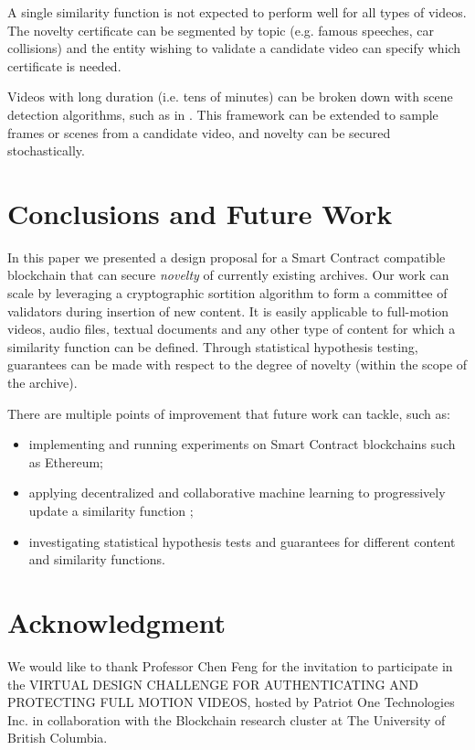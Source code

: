 \documentclass[conference]{IEEEtran}
\begin{document}
A single similarity function is not expected to perform well for all types of videos. The novelty certificate can be segmented by topic (e.g. famous speeches, car collisions) and the entity wishing to validate a candidate video can specify which certificate is needed. 

Videos with long duration (i.e. tens of minutes) can be broken down with scene detection algorithms, such as in \cite{bui2019archangel}. This framework can be extended to sample frames or scenes from a candidate video, and novelty can be secured stochastically.

\section{Conclusions and Future Work}
In this paper we presented a design proposal for a Smart Contract compatible blockchain that can secure \emph{novelty} of currently existing archives. Our work can scale by leveraging a cryptographic sortition algorithm to form a committee of validators during insertion of new content. It is easily applicable to full-motion videos, audio files, textual documents and any other type of content for which a similarity function can be defined. Through statistical hypothesis testing, guarantees can be made with respect to the degree of novelty (within the scope of the archive).

There are multiple points of improvement that future work can tackle, such as:
\begin{itemize}
    \item implementing and running experiments on Smart Contract blockchains such as Ethereum;
    \item applying decentralized and collaborative machine learning to progressively update a similarity function \cite{harris2019decentralized};
    \item investigating statistical hypothesis tests and guarantees for different content and similarity functions.
\end{itemize}
\section*{Acknowledgment}
We would like to thank Professor Chen Feng for the invitation to participate in the VIRTUAL DESIGN CHALLENGE FOR AUTHENTICATING  AND  PROTECTING  FULL  MOTION  VIDEOS, hosted by Patriot One Technologies Inc. in collaboration with the Blockchain research cluster at The University of British Columbia.
{}

\end{document}
